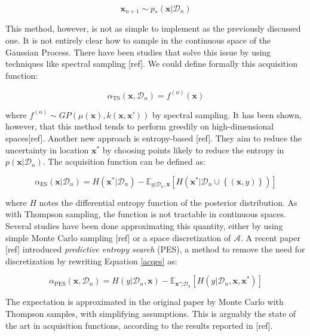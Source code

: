 \documentclass[10pt,a4paper,twoside]{book}
\begin{document}
\begin{equation}
\boldsymbol{x}_{n+1} \sim p_{*}(\boldsymbol{x}|\mathcal{D}_n)
\end{equation}

This method, however, is not as simple to implement as the previously discussed one. It is not entirely clear how to sample in the continuous space of the Gaussian Process. There have been studies that solve this issue by using techniques like spectral sampling [ref]. We could define formally this acquisition function:

\begin{equation}
\alpha_{\mathrm{TS}}(\boldsymbol{x}, \mathcal{D}_n) = f^{(n)}(\boldsymbol{x})
\end{equation}

where $f^{(n)} \sim GP\left(\mu(\boldsymbol{x}), k(\boldsymbol{x}, \boldsymbol{x'})\right)$ by spectral sampling. It has been shown, however, that this method tends to perform greedily on high-dimensional spaces[ref]. Another new approach is entropy-based [ref]. They aim to reduce the uncertainty in location $\boldsymbol{x}^{*}$ by choosing points likely to reduce the entropy in $p(\boldsymbol{x}|\mathcal{D}_n)$. The acquisition function can be defined as:

\begin{equation}
\label{acqes}
\alpha_{\mathrm{ES}}(\boldsymbol{x}|\mathcal{D}_n) = H(\boldsymbol{x}^*|\mathcal{D}_n) - \mathbb{E}_{y|\mathcal{D}_n, \boldsymbol{x}}\left[ H(\boldsymbol{x}^*|\mathcal{D}_n \cup \left\lbrace (\boldsymbol{x}, y) \right\rbrace) \right]
\end{equation}

where $H$ notes the differential entropy function of the posterior distribution. As with Thompson sampling, the function is not tractable in continuous spaces. Several studies have been done approximating this quantity, either by using simple Monte Carlo sampling [ref] or a space discretization of $\mathcal{A}$. A recent paper [ref] introduced \textit{predictive entropy search} (PES), a method to remove the need for discretization by rewriting Equation \ref{acqes} as:

\begin{equation}
\alpha_{\mathrm{PES}}(\boldsymbol{x}, \mathcal{D}_n) = H(y|\mathcal{D}_n, \boldsymbol{x}) - \mathbb{E}_{\boldsymbol{x}^*|\mathcal{D}_n}\left[ H(y |\mathcal{D}_n, \boldsymbol{x}, \boldsymbol{x}^*)  \right]
\end{equation}

The expectation is approximated in the original paper by Monte Carlo with Thompson samples, with simplifying assumptions. This is arguably the state of the art in acquisition functions, according to the results reported in [ref].\\
\end{document}
